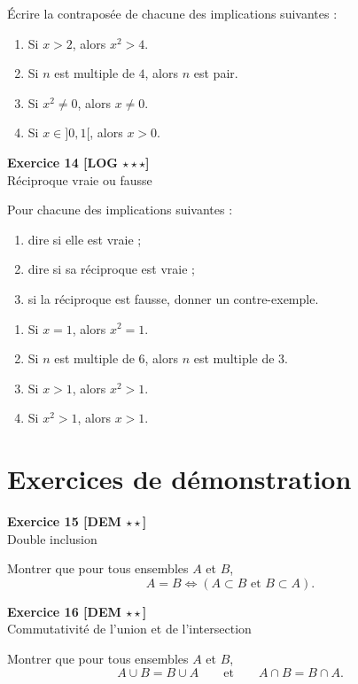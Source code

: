 \documentclass[11pt,a4paper]{article}
\begin{document}
Écrire la contraposée de chacune des implications suivantes :
\begin{enumerate}[label=\alph*)]
    \item Si \(x>2\), alors \(x^2>4\).
    \item Si \(n\) est multiple de \(4\), alors \(n\) est pair.
    \item Si \(x^2\neq 0\), alors \(x\neq 0\).
    \item Si \(x\in ]0,1[\), alors \(x>0\).
\end{enumerate}

\textbf{Exercice 14 [LOG \(\star\star\star\)]}\\
Réciproque vraie ou fausse

Pour chacune des implications suivantes :
\begin{enumerate}[label=\alph*)]
    \item dire si elle est vraie ;
    \item dire si sa réciproque est vraie ;
    \item si la réciproque est fausse, donner un contre-exemple.
\end{enumerate}

\begin{enumerate}[label=\arabic*)]
    \item Si \(x=1\), alors \(x^2=1\).
    \item Si \(n\) est multiple de \(6\), alors \(n\) est multiple de \(3\).
    \item Si \(x>1\), alors \(x^2>1\).
    \item Si \(x^2>1\), alors \(x>1\).
\end{enumerate}

\section*{Exercices de démonstration}

\textbf{Exercice 15 [DEM \(\star\star\)]}\\
Double inclusion

Montrer que pour tous ensembles \(A\) et \(B\),
\[
A=B \Longleftrightarrow (A\subset B \text{ et } B\subset A).
\]

\textbf{Exercice 16 [DEM \(\star\star\)]}\\
Commutativité de l’union et de l’intersection

Montrer que pour tous ensembles \(A\) et \(B\),
\[
A\cup B=B\cup A
\qquad \text{et} \qquad
A\cap B=B\cap A.
\]
\end{document}
